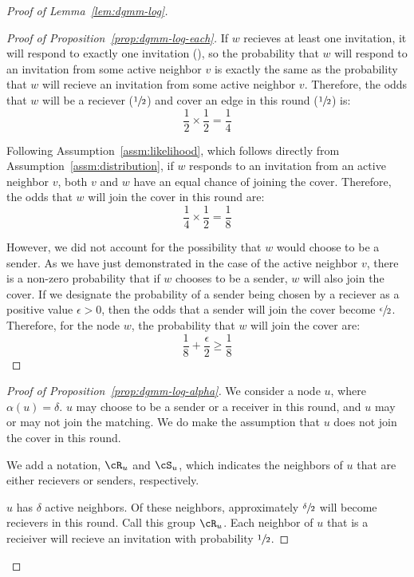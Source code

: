 \begin{proof}[Proof of Lemma~\ref{lem:dgmm-log}]
\begin{proof}[Proof of Proposition~\ref{prop:dgmm-log-each}]
If $w$ recieves at least one invitation, it will respond to exactly one invitation (), so the probability that $w$ will respond to an invitation from some active neighbor $v$ is exactly the same as the probability that $w$ will recieve an invitation from some active neighbor $v$. Therefore, the odds that $w$ will be a reciever ($\sfrac{1}{2}$) and cover an edge in this round ($\sfrac{1}{2}$) is: \begin{equation*}\frac{1}{2} \times \frac{1}{2} = \frac{1}{4}\end{equation*}

Following Assumption~\ref{assm:likelihood}, which follows directly from Assumption~\ref{assm:distribution}, if $w$ responds to an invitation from an active neighbor $v$, both $v$ and $w$ have an equal chance of joining the cover. Therefore, the odds that $w$ will join the cover in this round are:\begin{equation*}\frac{1}{4} \times \frac{1}{2} = \frac{1}{8}\end{equation*}

However, we did not account for the possibility that $w$ would choose to be a sender. As we have just demonstrated in the case of the active neighbor $v$, there is a non-zero probability that if $w$ chooses to be a sender, $w$ will also join the cover. If we designate the probability of a sender being chosen by a reciever as a positive value $\epsilon > 0$, then the odds that a sender will join the cover become $\sfrac{\epsilon}{2}$. Therefore, for the node $w$, the probability that $w$ will join the cover are:\begin{equation*}\frac{1}{8} + \frac{\epsilon}{2} \ge \frac{1}{8}\end{equation*}

\end{proof}
\begin{proof}[Proof of Proposition~\ref{prop:dgmm-log-alpha}]
We consider a node $u$, where $\alpha(u) = \delta$. $u$ may choose to be a sender or a receiver in this round, and $u$ may or may not join the matching. We do make the assumption that $u$ does not join the cover in this round.

We add a notation, $\cR_u$ and $\cS_u$, which indicates the neighbors of $u$ that are either recievers or senders, respectively.

$u$ has $\delta$ active neighbors. Of these neighbors, approximately $\sfrac{\delta}{2}$ will become recievers in this round. Call this group $\cR_u$. Each neighbor of $u$ that is a recieiver will recieve an invitation with probability $\sfrac{1}{2}$.


\end{proof}
\end{proof}
